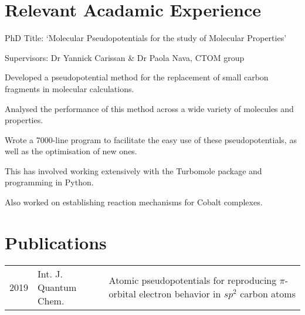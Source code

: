 \documentclass[letterpaper]{deedy-resume} %
\begin{document}
\hfill
%
%
\begin{minipage}[t]{0.66\textwidth} %


\section{Relevant Acadamic Experience}


\vspace{\topsep} %
\begin{tightitemize}
\item PhD Title: `Molecular Pseudopotentials for the study of Molecular Properties'
\item Supervisors: Dr Yannick Carissan \& Dr Paola Nava, CTOM group
\item Developed a pseudopotential method for the replacement of small carbon fragments in molecular calculations.
\item Analysed the performance of this method across a wide variety of molecules and properties.
\item Wrote a 7000-line program to facilitate the easy use of these pseudopotentials, as well as the optimisation of new ones. 
\item This has involved working extensively with the Turbomole package and programming in Python.
\item Also worked on establishing reaction mechanisms for Cobalt complexes.
\end{tightitemize}

\sectionspace %

\section{Publications} 

\begin{tabular}{rlm{7cm}}
2019 & Int. J. Quantum Chem. & Atomic pseudopotentials for reproducing $\pi$-orbital electron behavior in $sp^2$ carbon atoms \\
\end{tabular}


\end{minipage}
\end{document}
